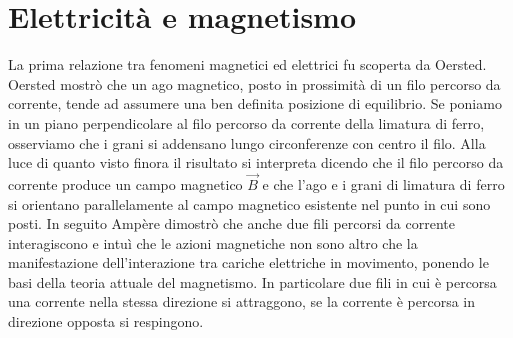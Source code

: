 \documentclass[class=book, crop=false, oneside, 12pt]{standalone}
\begin{document}
\section{Elettricità e magnetismo}

La prima relazione tra fenomeni magnetici ed elettrici fu scoperta da Oersted.
Oersted mostrò che un ago magnetico, posto in prossimità di un filo percorso da corrente, tende ad assumere una ben definita posizione di equilibrio. 
Se poniamo in un piano perpendicolare al filo percorso da corrente della limatura di ferro, osserviamo che i grani si addensano lungo circonferenze con centro il filo. 
Alla luce di quanto visto finora il risultato si interpreta dicendo che il filo percorso da corrente produce un campo magnetico \(\overrightarrow{B}\) e che l'ago e i grani di limatura di ferro si orientano parallelamente al campo magnetico esistente nel punto in cui sono posti. 
In seguito Ampère dimostrò che anche due fili percorsi da corrente interagiscono e intuì che le azioni magnetiche non sono altro che la manifestazione dell'interazione tra cariche elettriche in movimento, ponendo le basi della teoria attuale del magnetismo. 
In particolare due fili in cui è percorsa una corrente nella stessa direzione si attraggono, se la corrente è percorsa in direzione opposta si respingono.
\end{document}
